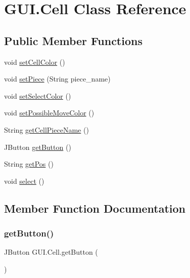\hypertarget{class_g_u_i_1_1_cell}{}\section{G\+U\+I.\+Cell Class Reference}
\label{class_g_u_i_1_1_cell}
\subsection*{Public Member Functions}
\begin{DoxyCompactItemize}
\item 
void \mbox{\hyperlink{class_g_u_i_1_1_cell_ad2f8366dabb8e443a3d5a2218ed8c7dd}{set\+Cell\+Color}} ()
\item 
void \mbox{\hyperlink{class_g_u_i_1_1_cell_a8d20e44749efa5888cb36cc36f8e9544}{set\+Piece}} (String piece\+\_\+name)
\item 
void \mbox{\hyperlink{class_g_u_i_1_1_cell_a1cf4a36fc527ce7e2167723d7dc0858b}{set\+Select\+Color}} ()
\item 
void \mbox{\hyperlink{class_g_u_i_1_1_cell_ae35da89d48d2af82eb085bb6fc41aafd}{set\+Possible\+Move\+Color}} ()
\item 
String \mbox{\hyperlink{class_g_u_i_1_1_cell_a156e05655896ab49489216b8303b6656}{get\+Cell\+Piece\+Name}} ()
\item 
J\+Button \mbox{\hyperlink{class_g_u_i_1_1_cell_a760f5031ba4b71cf50fadcb0a158f309}{get\+Button}} ()
\item 
String \mbox{\hyperlink{class_g_u_i_1_1_cell_aaa3748ffb6d456946ce2d582dc58ee77}{get\+Pos}} ()
\item 
void \mbox{\hyperlink{class_g_u_i_1_1_cell_a41b84e7aa586eda9927223fd0d84af5f}{select}} ()
\end{DoxyCompactItemize}


\subsection{Member Function Documentation}
\mbox{\label{class_g_u_i_1_1_cell_a760f5031ba4b71cf50fadcb0a158f309}} 
\subsubsection{\texorpdfstring{getButton()}{getButton()}}
{\footnotesize\ttfamily J\+Button G\+U\+I.\+Cell.\+get\+Button (\begin{DoxyParamCaption}{ }\end{DoxyParamCaption})\hspace{0.3cm}{\ttfamily [inline]}}


